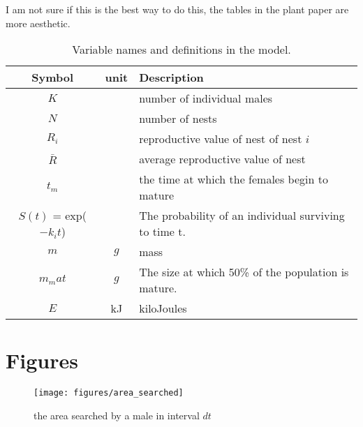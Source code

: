\documentclass[a4paper,11pt]{article}
\begin{document}
\clearpage


I am not sure if this is the best way to do this, the tables in the plant paper are more aesthetic.\\

\begin{table}[h!]
    \caption{Variable names and definitions in the model.}
    \centering
    \begin{tabular}{c | c | l }
        \hline
        Symbol & unit & Description\\
        \hline
        \hline
        $K$ & & number of individual males \\
        $N$ & & number of nests \\
        $R_i$ & & reproductive value of nest of nest $i$\\
        $\bar{R}$ & & average reproductive value of nest\\
        \hline
        $t_m$ & & the time at which the females begin to mature\\
        $S(t)$ = exp($-k_it$) & & The probability of an individual surviving to time t.\\
        \hline
        $m$ & $g$ & mass\\
        $m_mat$ & $g$ & The size at which 50\% of the population is mature.\\
        $E$ & kJ & kiloJoules\\
        \hline
    \end{tabular}
\end{table}

\section{Figures}

\begin{figure}[h!]
\centering
\texttt{[image: figures/area\_searched]}
\caption{the area searched by a male in interval $dt$}
\label{fig:area searched figure}
\end{figure}
\clearpage


\end{document}
